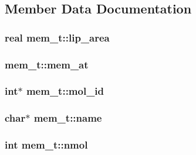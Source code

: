 \subsection{\-Member \-Data \-Documentation}
\hypertarget{structmem__t_a0125dec4ba3fa223abc5bd14f753830d}{
\subsubsection[{lip\-\_\-area}]{\setlength{\rightskip}{0pt plus 5cm}real {\bf mem\-\_\-t\-::lip\-\_\-area}}}\label{structmem__t_a0125dec4ba3fa223abc5bd14f753830d}
\hypertarget{structmem__t_ad3947679f695c15817d5807bea066b6c}{
\subsubsection[{mem\-\_\-at}]{ {\bf mem\-\_\-t\-::mem\-\_\-at}}}\label{structmem__t_ad3947679f695c15817d5807bea066b6c}
\hypertarget{structmem__t_ae360602263390bf93f1ed4e197be508b}{
\subsubsection[{mol\-\_\-id}]{\setlength{\rightskip}{0pt plus 5cm}int$\ast$ {\bf mem\-\_\-t\-::mol\-\_\-id}}}\label{structmem__t_ae360602263390bf93f1ed4e197be508b}
\hypertarget{structmem__t_a8de77b92c23a31647d3591391c4fd816}{
\subsubsection[{name}]{\setlength{\rightskip}{0pt plus 5cm}char$\ast$ {\bf mem\-\_\-t\-::name}}}\label{structmem__t_a8de77b92c23a31647d3591391c4fd816}
\hypertarget{structmem__t_a22e59fcf2ea5ccb50c9a8441f5e93639}{
\subsubsection[{nmol}]{\setlength{\rightskip}{0pt plus 5cm}int {\bf mem\-\_\-t\-::nmol}}}\label{structmem__t_a22e59fcf2ea5ccb50c9a8441f5e93639}

